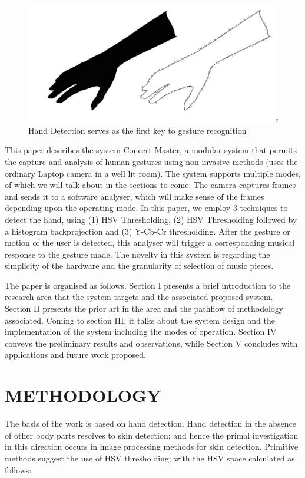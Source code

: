 \documentclass[letterpaper, 10 pt, twoside, conference]{ieeeconf}
\begin{document}
\begin{figure}[h]
  \centering
  \includegraphics[width=0.8\columnwidth]{Appearance_hands.jpg}
  \caption{Hand Detection serves as the first key to gesture recognition}
  \label{Overall1}
\end{figure}

This paper describes the system Concert Master, a modular system that permits the capture and analysis of human gestures using non-invasive methods (uses the ordinary Laptop camera in a well lit room).
The system supports multiple modes, of which we will talk about in the sections to come. The camera
captures frames and sends it to a software analyser, which will make sense of the frames depending
upon the operating mode. In this paper, we employ 3 techniques to detect the hand, using (1) HSV Thresholding,
(2) HSV Thresholding followed by a histogram backprojection and (3) Y-Cb-Cr thresholding. After the gesture or motion of the user is detected, this analyser will
trigger a corresponding musical response to the gesture made. The novelty in this system is regarding the
simplicity of the hardware and the granularity of selection of music pieces.

The paper is organised as follows. Section I presents a brief introduction to the research area that the system targets and
the associated proposed system. Section II presents the prior art in the area and the
pathflow of methodology associated. Coming to section III, it talks about the system design
and the implementation of the system including the modes of operation. Section IV conveys the
preliminary results and observations, while Section V concludes with applications and future
work proposed.

\section{METHODOLOGY}
\label{sec:pagestyle}

The basis of the work is based on hand detection. Hand detection in the absence of
other body parts resolves to skin detection; and hence the primal investigation in this
direction occurs in image processing methods for skin detection. Primitive methods
suggest the use of HSV thresholding; with the HSV space calculated as follows:
\end{document}
